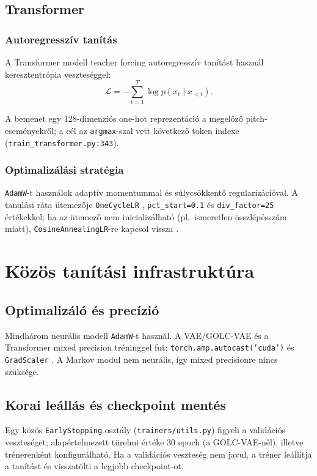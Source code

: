 \subsection{Transformer}

\subsubsection{Autoregresszív tanítás}

A Transformer modell teacher forcing autoregresszív tanítást használ keresztentrópia veszteséggel:
\[
\mathcal{L} = -\sum_{t=1}^T \log p(x_t \mid x_{<t}).
\]

A bemenet egy 128-dimenziós one-hot reprezentáció a megelőző pitch-eseményekről; a cél az \texttt{argmax}-szal vett következő token indexe (\texttt{train\_transformer.py:343}).

\subsubsection{Optimalizálási stratégia}

\texttt{AdamW}-t használok adaptív momentummal és súlycsökkentő regularizációval. A tanulási ráta ütemezője \texttt{OneCycleLR} \cite{smith2017superconvergence}, \texttt{pct\_start=0.1} és \texttt{div\_factor=25} értékekkel; ha az ütemező nem inicializálható (pl.\ ismeretlen összlépésszám miatt), \texttt{CosineAnnealingLR}-re kapcsol vissza \cite{loshchilov2016sgdr}.

\section{Közös tanítási infrastruktúra}

\subsection{Optimalizáló és precízió}

Mindhárom neurális modell \texttt{AdamW}-t használ. A VAE/GOLC-VAE és a Transformer mixed precision tréninggel fut: \texttt{torch.amp.autocast('cuda')} és \texttt{GradScaler} \cite{micikevicius2018mixed}. A Markov modul nem neurális, így mixed precisionre nincs szüksége.

\subsection{Korai leállás és checkpoint mentés}

Egy közös \texttt{EarlyStopping} osztály (\texttt{trainers/utils.py}) figyeli a validációs veszteséget; alapértelmezett türelmi értéke 30 epoch (a GOLC-VAE-nél), illetve trénerenként konfigurálható. Ha a validációs veszteség nem javul, a tréner leállítja a tanítást és visszatölti a legjobb checkpoint-ot.

